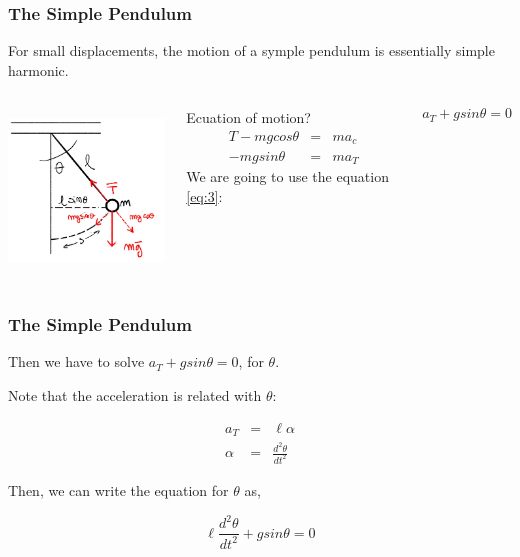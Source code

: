 \documentclass[]{beamer}
\begin{document}
\begin{frame}
\frametitle{The Simple Pendulum}

For small displacements, the motion of a symple pendulum  is essentially simple harmonic.

\pause

   \begin{columns}[c]
   \column{2in}  %
  


  \begin{center}
  \includegraphics[height=1.7in]{images3/pendulum.jpg}
\end{center}
\pause

   \column{2.5in}


Ecuation of motion?
\pause
\begin{eqnarray}
T-mgcos\theta&=&ma_c\\
-mgsin\theta&=&ma_T
\label{eq:3}
\end{eqnarray}
\pause
We are going to use the equation \ref{eq:3}:


\begin{equation}
a_T+gsin\theta=0
\end{equation}

   \end{columns}






\end{frame}




\begin{frame}
\frametitle{The Simple Pendulum}

Then we have to solve  $a_T+gsin\theta=0$, for $\theta$. 
\vspace{3mm}
\pause

Note that the acceleration is related with $\theta$:
\pause

\begin{eqnarray*}
a_T&=&\ell \alpha\\
\alpha&=&\frac{d^2\theta}{dt^2}
\end{eqnarray*}

\pause

Then, we can write the equation for $\theta$ as,
\pause

\begin{equation}
\ell \frac{d^2\theta}{dt^2}+gsin\theta=0
\label{eq:4}
\end{equation}


\end{frame}
\end{document}
